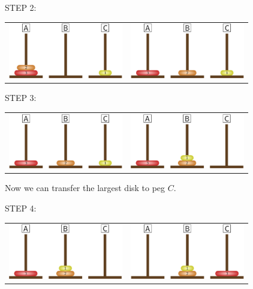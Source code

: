 STEP 2:
\begin{center}
\begin{tabular}{l|r}
\includegraphics[width=50mm]{./H32-1}
&
\includegraphics[width=50mm]{./H33-1}
\end{tabular}
\end{center}

STEP 3:
\begin{center}
\begin{tabular}{l|r}
\includegraphics[width=50mm]{./H33-1}
&
\includegraphics[width=50mm]{./H34-1}
\end{tabular}
\end{center}

Now we can transfer the largest disk to peg $C$.

STEP 4:
\begin{center}
\begin{tabular}{l|r}
\includegraphics[width=50mm]{./H34-1}
&
\includegraphics[width=50mm]{./H35-1}
\end{tabular}
\end{center}

